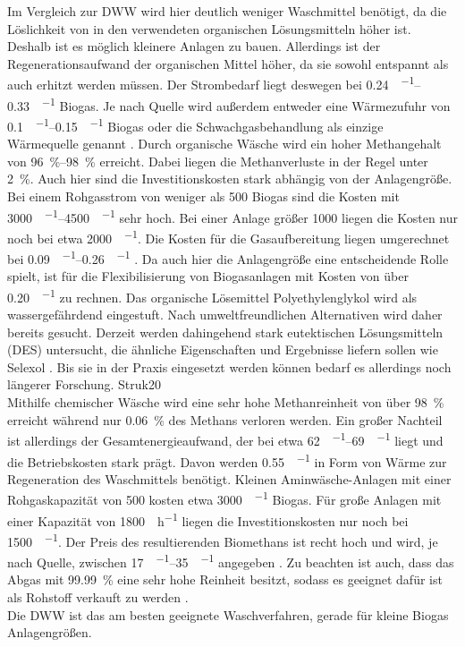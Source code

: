 Im Vergleich zur \gls{DWW} wird hier deutlich weniger Waschmittel benötigt, da die Löslichkeit von  in den verwendeten organischen Lösungsmitteln höher ist. Deshalb ist es möglich kleinere Anlagen zu bauen. Allerdings ist der Regenerationsaufwand der organischen Mittel höher, da sie sowohl entspannt als auch erhitzt werden müssen. Der Strombedarf liegt deswegen bei \SIrange{0,24}{0,33}{\kwh\per\normvol} Biogas. Je nach Quelle wird außerdem entweder eine Wärmezufuhr von \SIrange{0,1}{0,15}{\kwh\per\normvol} Biogas oder die Schwachgasbehandlung als einzige Wärmequelle genannt \parencite{Emp18}. Durch organische Wäsche wird ein hoher Methangehalt von \SIrange{96}{98}{\percent} erreicht. Dabei liegen die Methanverluste in der Regel unter \SI{2}{\percent}. Auch hier sind die Investitionskosten stark abhängig von der Anlagengröße. Bei einem Rohgasstrom von weniger als \SI{500}{\normvolh} Biogas sind die Kosten mit \SIrange{3000}{4500}{\sieuro\per\normvolh} sehr hoch. Bei einer Anlage größer \SI{1000}{\normvolh} liegen die Kosten nur noch bei etwa \SI{2000}{\sieuro\per\normvolh}. Die Kosten für die Gasaufbereitung liegen umgerechnet bei \SIrange{0,09}{0,26}{\sieuro\per\normvol} \parencite{FNR14}. Da auch hier die Anlagengröße eine entscheidende Rolle spielt, ist für die Flexibilisierung von Biogasanlagen mit Kosten von über \SI{0,20}{\sieuro\per\normvol} zu rechnen.
Das organische Lösemittel Polyethylenglykol wird als wassergefährdend eingestuft. Nach umweltfreundlichen Alternativen wird daher bereits gesucht. Derzeit werden dahingehend stark eutektischen Lösungsmitteln (DES) untersucht, die ähnliche Eigenschaften und Ergebnisse liefern sollen wie Selexol \textsuperscript{\textregistered}. Bis sie in der Praxis eingesetzt werden können bedarf es allerdings noch längerer Forschung. \parencite{FNR14} {Struk20} \\

Mithilfe chemischer Wäsche wird eine sehr hohe Methanreinheit von über \SI{98}{\percent} erreicht\parencite{KGKK2019} während nur \SI{0,06}{\percent} des Methans verloren werden. Ein großer Nachteil ist allerdings der Gesamtenergieaufwand, der bei etwa \SIrange{62}{69}{\kwh\per\normvol} liegt und die Betriebskosten stark prägt. Davon werden \SI{0,55}{\kwh\per\normvol} in Form von Wärme zur Regeneration des Waschmittels benötigt. Kleinen Aminwäsche-Anlagen mit einer Rohgaskapazität von \SI{500}{\normvolh} kosten etwa \SI{3000}{\sieuro\per\normvolh} Biogas. Für große Anlagen mit einer Kapazität von \SI{1800}{\normvol\per\hour} liegen die Investitionskosten nur noch bei \SI{1500}{\sieuro\per\normvolh}. Der Preis des resultierenden Biomethans ist recht hoch und wird, je nach Quelle, zwischen \SIrange{17}{35}{\sieuro\per\normvol} angegeben \parencite{Coll17} \parencite{Emp18}. Zu beachten ist auch, dass das Abgas mit \SI{99,99}{\percent} eine sehr hohe  Reinheit besitzt, sodass es geeignet dafür ist als Rohstoff verkauft zu werden \parencite{DSW13}. \parencite{BHPT13} \\
Die \gls{DWW} ist das am besten geeignete Waschverfahren, gerade für kleine Biogas Anlagengrößen. \\

